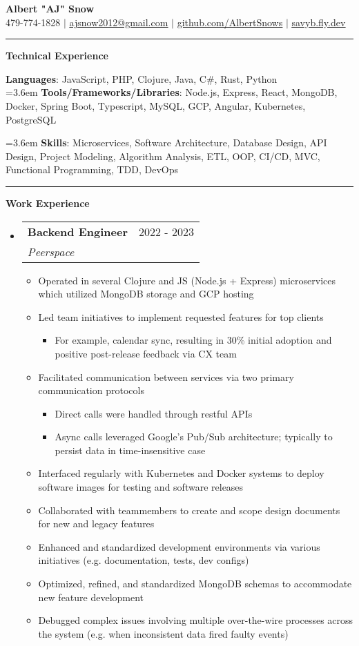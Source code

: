 \documentclass[letterpaper,11pt]{article}
\makeatletter
\newcommand{\resumeItem}[1]{
  \item\small{
    {#1 \vspace{-2pt}}
  }
}
\newcommand{\resumeSubheading}[4]{
  \vspace{-2pt}\item
    \begin{tabular*}{0.97\textwidth}[t]{l@{\extracolsep{\fill}}r}
      \textbf{#1} & #2 \\
      \textit{\small#3} & \textit{\small #4} \\
    \end{tabular*}\vspace{0pt}
}
\newcommand{\resumeSubHeadingListStart}{\begin{itemize}[leftmargin=0.15cm, label={}]}
\newcommand{\resumeSubHeadingListEnd}{\end{itemize}}
\newcommand{\resumeItemListStart}{\begin{itemize}}
\newcommand{\resumeItemListEnd}{\end{itemize}\vspace{-5pt}}
\makeatother
\begin{document}
\textbf{\normalshape \Large \textcolor{magic_blue}{Albert "AJ" Snow}} \\ \vspace{3pt}
\small 479-774-1828 $|$ \href{ mailto:ajsnow2012@gmail.com }
{\underline{ajsnow2012@gmail.com}} $|$
\href{https://github.com/AlbertSnows}{\underline{github.com/AlbertSnows}}
$|$ \href{https://savyb.fly.dev/}{\underline{savyb.fly.dev}}
\noindent\rule{19.5cm}{0.4pt}


%
\textbf{\large \textcolor{magic_blue}{Technical Experience} }
\begin{onehalfspace}

    \textbf{ Languages}{: JavaScript, PHP, Clojure, Java, 
    C\#, Rust, Python } \\

    \hangindent=3.6em
    \textbf{ Tools/Frameworks/Libraries}{: 
    Node.js, Express, React, MongoDB, Docker, Spring Boot, 
    Typescript, MySQL, GCP, Angular, Kubernetes, PostgreSQL } \\
\end{onehalfspace}

\hangindent=3.6em
\textbf{ Skills}{: }
Microservices, Software Architecture, Database Design, 
API Design, Project Modeling, Algorithm Analysis, ETL, 
OOP, CI/CD,
MVC, Functional Programming, TDD, DevOps

\noindent\rule{19.5cm}{0.4pt}

\textbf{\large \textcolor{magic_blue}{Work Experience}}
\resumeSubHeadingListStart
\resumeSubheading
{Backend Engineer}{2022 - 2023}
{Peerspace}{}
\resumeItemListStart
\resumeItem{Operated in several Clojure and JS (Node.js + Express) microservices which utilized MongoDB storage and GCP hosting}
\resumeItem{ Led team initiatives to implement requested features for top clients }
\begin{itemize}
	\item For example, calendar sync, resulting in 30\% initial adoption and positive post-release feedback via CX team
\end{itemize}
\resumeItem{Facilitated communication between services via two primary communication protocols}
\begin{itemize}
	\item Direct calls were handled through restful APIs
	\item Async calls leveraged Google's Pub/Sub architecture; typically to persist data in time-insensitive case
\end{itemize}
\resumeItem{Interfaced regularly with Kubernetes and Docker systems to deploy software images for testing and software releases}
\resumeItem{Collaborated with teammembers to create and scope design documents for new and legacy features}
\resumeItem{Enhanced and standardized development environments via various initiatives (e.g. documentation, tests, dev configs)}
\resumeItem{Optimized, refined, and standardized MongoDB schemas to accommodate new feature development}
\resumeItem{Debugged complex issues involving multiple over-the-wire processes across the system (e.g. when inconsistent data fired faulty events) }
\resumeItemListEnd
\resumeSubHeadingListEnd
\end{document}
